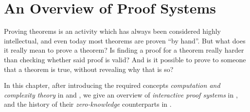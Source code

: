 \chapter{An Overview of Proof Systems}\label{chap:computation}
Proving theorems is an activity which has always been considered highly intellectual, and 
even today most theorems are proven ``by hand''. 
But what does it really mean to prove a theorem? Is finding a proof for a theorem really harder 
than checking whether said proof is valid? And is it possible to prove to someone that a theorem is 
true, without revealing why that is so?

In this chapter, after introducing the required concepts \emph{computation and complexity theory} 
in  and , we give an overview of 
\emph{interactive proof systems} in , and the history 
of their \emph{zero-knowledge} counterparts in .





